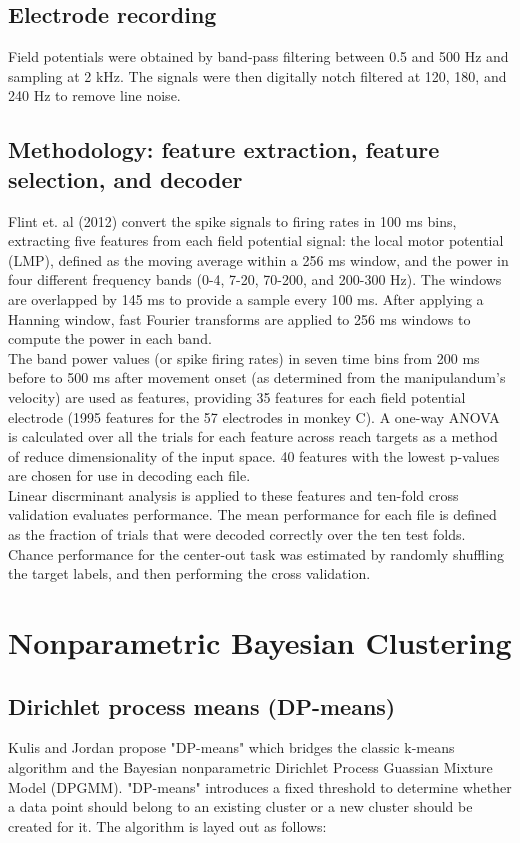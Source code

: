 \documentclass{article}
\begin{document}
\subsection{Electrode recording}
Field potentials were obtained by band-pass filtering between 0.5 and 500 Hz and sampling at 2 kHz.  The signals were then digitally notch filtered at 120, 180, and 240 Hz to remove line noise.  

\subsection{Methodology: feature extraction, feature selection, and decoder}
\noindent
Flint et. al (2012) convert the spike signals to firing rates in 100 ms bins, extracting five features from each field potential signal:  the local motor potential (LMP), defined as the moving average within a 256 ms window, and the power in four different frequency bands (0-4, 7-20, 70-200, and 200-300 Hz).  The windows are overlapped by 145 ms to provide a sample every 100 ms.  After applying a Hanning window, fast Fourier transforms are applied to 256 ms windows to compute the power in each band.   \\

\noindent
The band power values (or spike firing rates) in seven time bins from 200 ms before to 500 ms after movement onset (as determined from the manipulandum's velocity) are used as features, providing 35 features for each field potential electrode (1995 features for the 57 electrodes in monkey C).  A one-way ANOVA is calculated over all the trials for each feature across reach targets as a method of reduce dimensionality of the input space.  40 features with the lowest p-values are chosen for use in decoding each file.  \\

\noindent
Linear discrminant analysis is applied to these features and ten-fold cross validation evaluates performance.  The mean performance for each file is defined as the fraction of trials that were decoded correctly over the ten test folds.  Chance performance for the center-out task was estimated by randomly shuffling the target labels, and then performing the cross validation.

\section{Nonparametric Bayesian Clustering}

\subsection{Dirichlet process means (DP-means)}
Kulis and Jordan propose "DP-means" which bridges the classic k-means algorithm and the Bayesian nonparametric Dirichlet Process Guassian Mixture Model (DPGMM).  "DP-means" introduces a fixed threshold to determine whether a data point should belong to an existing cluster or a new cluster should be created for it.  The algorithm is layed out as follows: \\
\end{document}
